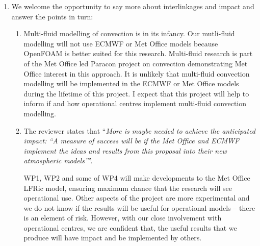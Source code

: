 \begin{enumerate}
\item \label{it:interlinkages} We welcome the opportunity to say more about interlinkages and impact and answer the points in turn:
    \begin{enumerate}
    \item Multi-fluid modelling of convection is in its infancy. Our mutli-fluid modelling  will not use ECMWF or Met Office models because OpenFOAM is better suited for this research. Multi-fluid research is part of the Met Office led Paracon project on convection demonstrating Met Office interest in this approach. It is unlikely that multi-fluid convection modelling will be implemented in the ECMWF or Met Office models during the lifetime of this project. I expect that this project will help to inform if and how operational centres implement multi-fluid convection modelling.
    
    \item The reviewer states that ``{\it More is maybe needed to achieve the anticipated impact: ``A measure of success will be if the Met Office and ECMWF implement the ideas and results from this proposal into their new atmospheric models''}''.
    
    WP1, WP2 and some of WP4 will make developments to the Met Office LFRic model, ensuring maximum chance that the research will see operational use. Other aspects of the project are more experimental and we do not know if the results will be useful for operational models -- there is an element of risk. However, with our close involvement with operational centres, we are confident that, the useful results that we produce will have impact and be implemented by others.
    \end{enumerate}

\end{enumerate}

